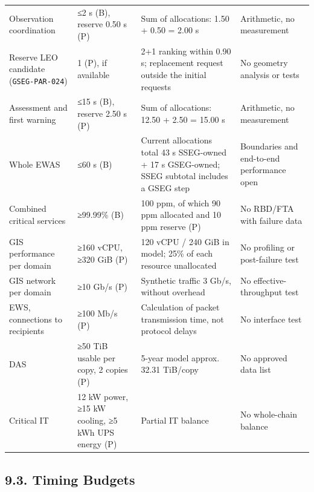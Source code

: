 \begingroup{}
\begin{longtable}{|P{0.25}|P{0.25}|P{0.37}|P{0.13}|}
\hline{}
 &  &  & \\ \hline
\endhead
\hline\endlastfoot
Observation coordination & ≤2 s (B), reserve 0.50 s (P) & Sum of allocations: 1.50 + 0.50 = 2.00 s & Arithmetic, no measurement\\ \hline
Reserve LEO candidate (\texttt{GSEG-\allowbreak{}PAR-\allowbreak{}024}) & 1 (P), if available & 2+1 ranking within 0.90 s; replacement request outside the initial requests & No geometry analysis or tests\\ \hline
Assessment and first warning & ≤15 s (B), reserve 2.50 s (P) & Sum of allocations: 12.50 + 2.50 = 15.00 s & Arithmetic, no measurement\\ \hline
Whole EWAS & ≤60 s (B) & Current allocations total 43 s SSEG-owned + 17 s GSEG-owned; SSEG subtotal includes a GSEG step & Boundaries and end-to-end performance open\\ \hline
Combined critical services & ≥99.99\% (B) & 100 ppm, of which 90 ppm allocated and 10 ppm reserve (P) & No RBD/\allowbreak{}FTA with failure data\\ \hline
GIS performance per domain & ≥160 vCPU, ≥320 GiB (P) & 120 vCPU /\allowbreak{} 240 GiB in model; 25\% of each resource unallocated & No profiling or post-failure test\\ \hline
GIS network per domain & ≥10 Gb/\allowbreak{}s (P) & Synthetic traffic 3 Gb/\allowbreak{}s, without overhead & No effective-throughput test\\ \hline
EWS, connections to recipients & ≥100 Mb/\allowbreak{}s (P) & Calculation of packet transmission time, not protocol delays & No interface test\\ \hline
DAS & ≥50 TiB usable per copy, 2 copies (P) & 5-year model approx. 32.31 TiB/\allowbreak{}copy & No approved data list\\ \hline
Critical IT & 12 kW power, ≥15 kW cooling, ≥5 kWh UPS energy (P) & Partial IT balance & No whole-chain balance\\*
\end{longtable}
\endgroup

\subsection{9.3. Timing Budgets}\label{ddjf-9-3}

